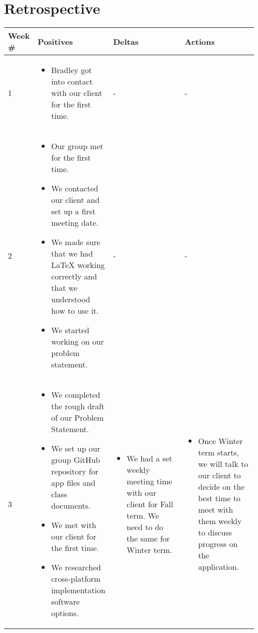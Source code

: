 \documentclass[draftclsnofoot, onecolumn, 10pt, compsoc]{IEEEtran}
\begin{document}
   \section{Retrospective}
      \begin{longtable}{|p{0.1\linewidth}|p{0.3\linewidth}|p{0.3\linewidth}|p{0.3\linewidth}|}
         \hline
         Week \# & Positives & Deltas & Actions \\ \hline
         1
         &
         \begin{itemize}
            \item Bradley got into contact with our client for the first time.
         \end{itemize}
         & -
         & - \\ \hline

         2
         &
         \begin{itemize}
            \item Our group met for the first time.
            \item We contacted our client and set up a first meeting date.
            \item We made sure that we had LaTeX working correctly and that we understood how to use it.
            \item We started working on our problem statement.
         \end{itemize}
         & -
         & - \\ \hline

         3
         &
         \begin{itemize}
            \item We completed the rough draft of our Problem Statement.
            \item We set up our group GitHub repository for app files and class documents.
            \item We met with our client for the first time.
            \item We researched cross-platform implementation software options.
         \end{itemize}
         &
         \begin{itemize}
            \item We had a set weekly meeting time with our client for Fall term. We need to do the same for Winter term.
         \end{itemize}
         &
         \begin{itemize}
            \item Once Winter term starts, we will talk to our client to decide on the best time to meet with them weekly to discuss progress on the application.
         \end{itemize} \\ \hline


\end{longtable}
\end{document}

